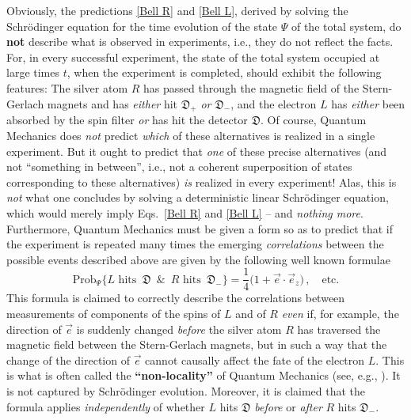 \documentclass[12pt]{article}
\begin{document}
{{Obviously}}, the predictions \eqref{Bell R} and \eqref{Bell L}, derived by solving the Schr\"odinger equation for 
the time evolution of the state $\Psi$ of the total system, do {\bf{not}} describe what is observed in experiments, i.e.,
they do not reflect the facts. For, in every successful experiment, the state of the total system occupied at large times 
$t$, when the experiment is completed, should exhibit the following features: 
The silver atom $R$ has passed through the magnetic field of the Stern-Gerlach magnets and has \textit{either} hit 
$\mathfrak{D}_{+}$ \textit{or} $\mathfrak{D}_{-}$, and the electron $L$ has \textit{either} been absorbed by the 
spin filter \textit{or} has hit the detector $\mathfrak{D}$. Of course, Quantum Mechanics does \textit{not} predict \textit{which} 
of these alternatives is realized in a single experiment. But it ought to predict that \textit{one} of these
precise alternatives (and not ``something in between'', i.e., not a coherent superposition of states corresponding 
to these alternatives) \textit{is} realized in every experiment! Alas, this is \textit{not} 
what one concludes by solving a deterministic linear Schr\"odinger equation, which would merely imply Eqs.~\eqref{Bell R} 
and \eqref{Bell L} -- and \textit{nothing more}. Furthermore, Quantum Mechanics must be given a form so as to predict
that if the experiment is repeated many times the emerging \textit{correlations} between the possible events described above
are given by the following well known formulae
\begin{equation}\label{probability}
\text{Prob}_{\Psi}\big\{L \text{ hits }\, \mathfrak{D}\,\,\, \& \, \,\,R \text{ hits } \,\mathfrak{D}_{-} \big\} = 
\frac{1}{4}\Big(1 + \vec{e}\cdot \vec{e}_z\Big)\,, \quad \text{etc.}
\end{equation}
This formula is claimed to correctly describe the correlations between measurements of components  of the spins of $L$ 
and of $R$ \textit{even} if, for example, the direction of $\vec{e}$ is suddenly changed \textit{before} the silver atom $R$ 
has traversed the magnetic field between the Stern-Gerlach magnets, but in such a way that the change of the direction 
of $\vec{e}$ cannot causally affect the fate of the electron $L$. This is what is often called the {\bf{``non-locality''}} of 
Quantum Mechanics (see, e.g., \cite{BGold}). It is not captured by Schr\"odinger evolution. Moreover, it is claimed that the formula applies 
\textit{independently} of whether $L$ hits $\mathfrak{D}$ \textit{before} or \textit{after} $R$ hits $\mathfrak{D}_{-}$.
\end{document}
